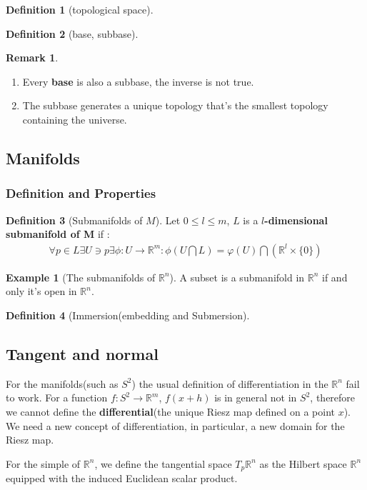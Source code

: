 \documentclass[12pt,fleqn]{book}
\theoremstyle{definition}
\newtheorem{definition}{Definition}[section]
\newtheorem*{example}{Example}
\newtheorem*{remark}{Remark}
\begin{document}
\begin{definition}[topological space]
\end{definition}

\begin{definition}[base, subbase]
\end{definition}
\begin{remark}
	\quad
	\begin{enumerate}
		\item Every \textbf{base} is also a subbase, the inverse is not true.
		\item The subbase generates a unique topology that's the smallest topology containing the universe.
	\end{enumerate}
\end{remark}


\subsection{Manifolds}
\subsubsection*{Definition and Properties}
\begin{definition}[Submanifolds of $M$]
	Let $0 \leq l \leq m$, $L$ is a \textbf{$l$-dimensional submanifold of M} if :
	\begin{align*}
		\forall p \in L \exists U \ni p \exists \phi: U \rightarrow \mathbb{R}^m: \phi(U \bigcap L) = \varphi(U) \bigcap 
		(\mathbb{R}^l \times \{0\} )
	\end{align*}
\end{definition}
\begin{example}[The submanifolds of $\mathbb{R}^n$]
	A subset is a submanifold in $\mathbb{R}^n$ if and only it's open in $\mathbb{R}^n$.
\end{example}

\begin{definition}[Immersion(embedding and Submersion]
\end{definition}





\subsection{Tangent and normal}
For the manifolds(such as $S^2$) the usual definition of differentiation in the $\mathbb{R}^n$ fail to work. For a function $f: S^2 \rightarrow \mathbb{R}^m$, $f(x + h)$ is in general not in $S^2$, therefore we cannot define the \textbf{differential}(the unique Riesz map defined on a point $x$). We need a new concept of differentiation, in particular, a new domain for the Riesz map.\par
For the simple of $\mathbb{R}^n$, we define the tangential space $T_p \mathbb{R}^n$ as the Hilbert space $\mathbb{R}^n$ equipped with the induced Euclidean scalar product.
\end{document}
